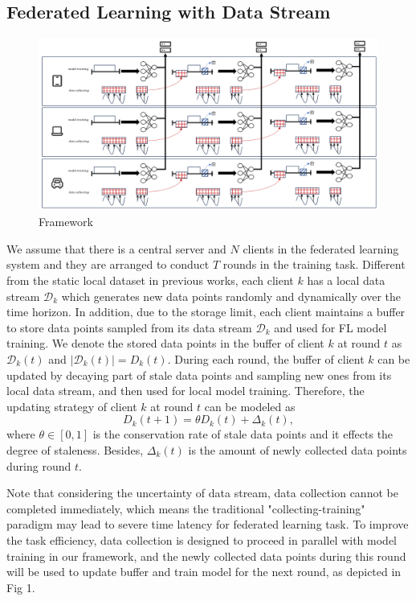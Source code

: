\documentclass{article}
\theoremstyle{plain}
\theoremstyle{definition}
\theoremstyle{remark}
\begin{document}
\subsection{Federated Learning with Data Stream}
\begin{figure}[ht]
  \centering
  \includegraphics[width=\columnwidth]{figures/figure_21.png}
  \caption{Framework}
\end{figure}
We assume that there is a central server and $N$ clients in the federated learning system and they are arranged to conduct $T$ rounds in the training task. Different from the static local dataset in previous works, each client $k$ has a local data stream $\mathcal{D}_k$ which generates new data points randomly and dynamically over the time horizon.
In addition, due to the storage limit, each client maintains a buffer to store data points sampled from its data stream $\mathcal{D}_k$ and used for FL model training.
We denote the stored data points in the buffer of client $k$ at round $t$ as $\mathcal{D}_k(t)$ and $\vert\mathcal{D}_k(t)\vert = D_k(t)$. 
During each round, the buffer of client $k$ can be updated by decaying part of stale data points and sampling new ones from its local data stream, and then used for local model training.
Therefore, the updating strategy of client $k$ at round $t$ can be modeled as
\begin{equation}
  D_k(t+1) = \theta D_k(t) + \Delta_k(t),
  \label{formulation:update}
\end{equation}
where $\theta \in [0,1]$ is the conservation rate of stale data points and it effects the degree of staleness. 
Besides, $\Delta_k(t)$ is the amount of newly collected data points during round $t$.

Note that considering the uncertainty of data stream, data collection cannot be completed immediately, which means the traditional "collecting-training" paradigm may lead to severe time latency for federated learning task.
To improve the task efficiency, data collection is designed to proceed in parallel with model training in our framework, and the newly collected data points during this round will be used to update buffer and train model for the next round, as depicted in Fig 1.
\end{document}
